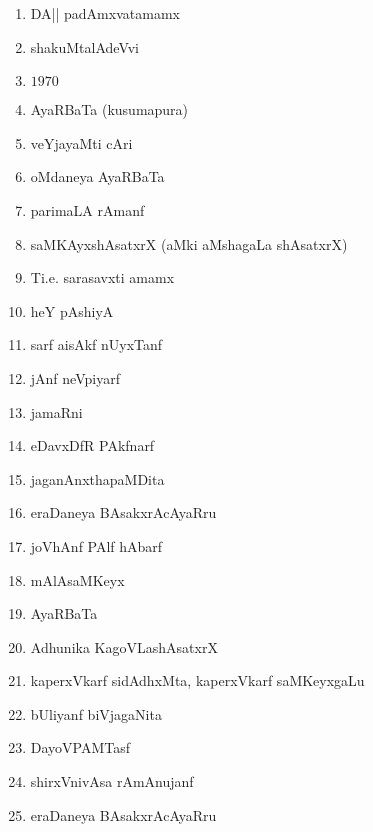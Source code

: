 \begin{enumerate}
\item DA|| padAmxvatamamx

\item shakuMtalAdeVvi

\item $1970$

\item AyaRBaTa (kusumapura)

\item veYjayaMti cAri

\item oMdaneya AyaRBaTa

\item parimaLA rAmanf

\item saMKAyxshAsatxrX (aMki aMshagaLa shAsatxrX)

\item Ti.e. sarasavxti amamx 

\item heY pAshiyA

\item sarf aisAkf nUyxTanf

\item jAnf neVpiyarf

\item jamaRni

\item eDavxDfR PAkfnarf

\item jaganAnxthapaMDita

\item eraDaneya BAsakxrAcAyaRru

\item joVhAnf PAlf hAbarf

\item mAlAsaMKeyx

\item AyaRBaTa

\item Adhunika KagoVLashAsatxrX

\item kaperxVkarf sidAdhxMta, kaperxVkarf saMKeyxgaLu

\item bUliyanf biVjagaNita

\item DayoVPAMTasf

\item shirxVnivAsa rAmAnujanf

\item eraDaneya BAsakxrAcAyaRru


\end{enumerate}

